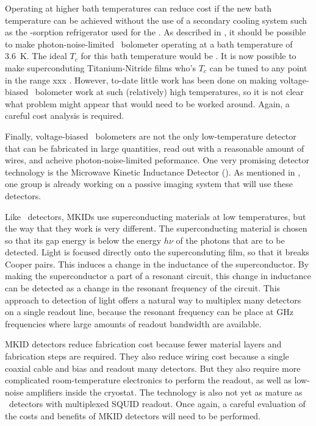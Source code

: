 Operating at higher bath temperatures can reduce cost if the new bath temperature can be achieved without the use of a secondary cooling system such as the -sorption refrigerator used for the \Imager.
As described in , it should be possible to make photon-noise-limited \TES\ bolometer operating at a bath temperature of \SI{3.6}{\K}.
The ideal $T_c$ for this bath temperature would be .
It is now possible to make superconduting Titanium-Nitride films who's $T_c$ can be tuned to any point in the range xxx \cite{xxx}.
However, to-date little work has been done on making voltage-biased \TES\ bolometer work at such (relatively) high temperatures, so it is not clear what problem might appear that would need to be worked around.
Again, a careful cost analysis is required.

Finally, voltage-biased \TES\ bolometers are not the only low-temperature detector that can be fabricated in large quantities, read out with a reasonable amount of wires, and acheive photon-noise-limited peformance.
One very promising detector technology is the Microwave Kinetic Inductance Detector (\MKID).
As mentioned in , one group is already working on a passive imaging system that will use these detectors.

Like \TES\ detectors, MKIDs use superconducting materials at low temperatures, but the way that they work is very different.
The superconducting material is chosen so that its gap energy is below the energy $h \nu$ of the photons that are to be detected.
Light is focused directly onto the superconduting film, so that it breaks Cooper pairs.
This induces a change in the inductance of the superconductor.
By making the superconductor a part of a resonant circuit, this change in inductance can be detected as a change in the resonant frequency of the circuit.
This approach to detection of light offers a natural way to multiplex many detectors on a single readout line, because the resonant frequency can be place at GHz frequencies where large amounts of readout bandwidth are available.

MKID detectors reduce fabrication cost because fewer material layers and fabrication steps are required.
They also reduce wiring cost because a single coaxial cable and bias and readout many detectors.
But they also require more complicated room-temperature electronics to perform the readout, as well as low-noise amplifiers inside the cryostat.
The technology is also not yet as mature as \TES\ detectors with multiplexed SQUID readout.
Once again, a careful evaluation of the costs and benefits of MKID detectors will need to be performed.

